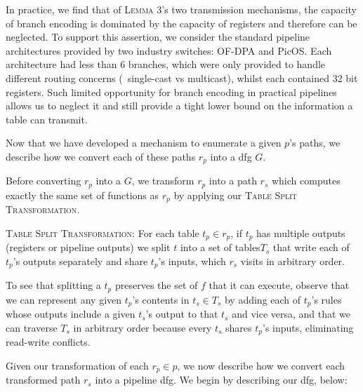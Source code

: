 In practice, we find that of \textsc{Lemma 3}'s two transmission mechanisms, the capacity of branch encoding is dominated by the capacity of registers and therefore can be neglected. To support this assertion, we consider the standard pipeline architectures provided by two industry switches: OF-DPA and PicOS. Each architecture had less than 6 branches, which were only provided to handle different routing concerns (\eg\ single-cast vs multicast), whilst each contained 32 bit registers. Such limited opportunity for branch encoding in practical pipelines allows us to neglect it and still provide a tight lower bound on the information a table can transmit.

 Now that we have developed a mechanism to enumerate a given $p$'s paths, we describe how we convert each of these paths $r_p$ into a dfg $G$.

Before converting $r_p$ into a $G$, we transform $r_p$ into a path $r_s$ which computes exactly the same set of functions as $r_p$ by applying our \textsc{Table Split Transformation}.

\vspace{2mm}
\textsc{Table Split Transformation:} For each table $t_p \in r_p$, if $t_p$ has multiple outputs (registers or pipeline outputs) we split $t$ into a set of tables$T_s$ that write each of $t_p$'s outputs separately and share $t_p$'s inputs, which $r_s$ visits in arbitrary order.
\vspace{2mm}

To see that splitting a $t_p$ preserves the set of $f$ that it can execute, observe that  we can represent any given $t_p$'s contents in $t_s \in T_s$ by adding each of $t_p$'s rules whose outputs include a given $t_s$'s output to that $t_s$ and vice versa, and that we can traverse $T_s$ in arbitrary order because every $t_s$ shares $t_p$'s inputs, eliminating read-write conflicts.

Given our transformation of each $r_p \in p$, we now describe how we convert each transformed path $r_s$ into a pipeline dfg. We begin by describing our dfg, below:


